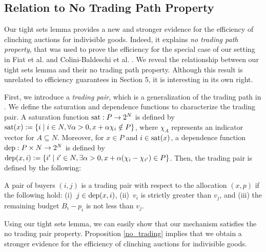\documentclass[letterpaper,11pt]{article}
\begin{document}
\subsection{Relation to No Trading Path Property}
Our tight sets lemma provides a new and stronger evidence
for the efficiency of clinching auctions for indivisible goods.
Indeed, it explains {\it no trading path property}, that was used to prove the efficiency
for the special case of our setting in Fiat et al. \cite{FLSS2011}  and Colini-Baldeschi et al. \cite{BHLS2015}.
We reveal the relationship between our tight sets lemma and their
no trading path property. 
Although this result is unrelated to efficiency guarantees in Section 5, 
it is interesting in its own right.
	
	First, we introduce a {\it trading pair}, which is a generalization of 
	the trading path in \cite{BHLS2015, FLSS2011}.
	We define the saturation and dependence functions to characterize the trading pair. 
	A saturation function ${\rm sat}:P \to 2^N$ is defined by 
	${\rm sat}(x):=\{i\mid i\in N, \forall \alpha>0, x+\alpha \chi_i\notin P\}$,
	where $\chi_{A}$ represents an indicator vector for $A\subseteq N$.
	Moreover, for $x\in P$ and $i \in {\rm sat}(x)$, 
	a dependence function ${\rm dep} : P \times N \to 2^N$ is defined by
	${\rm dep}(x,i):=\{i'\mid i'\in N, \exists \alpha>0, x+\alpha (\chi_i-\chi_{i'})\in P\}$.
	Then, the trading pair is defined by the following: 
		
\begin{definition}
\label{trading_pair}
{\rm A pair of buyers $(i, j)$ is a} trading pair {\rm with respect to the allocation
$(x, p)$ if the following hold: (i)\, $j\in {\rm dep}(x, i)$, (ii)\, $v_i$ is strictly greater than $v_j$, and 
(iii) the remaining budget $B_i-p_i$ is not less than $v_j$.}
\end{definition}

	Using our tight sets lemma, 
	we can easily show that our mechanism satisfies the no trading pair property.
	Proposition \ref{no_trading} implies that we obtain a stronger evidence 
	for the efficiency of clinching auctions for indivisible goods.
\end{document}

